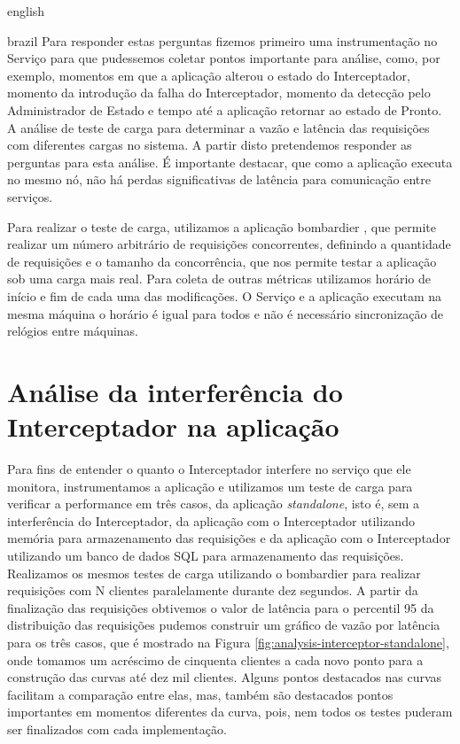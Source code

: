\begin{otherlanguage*}{english}
\begin{otherlanguage*}{brazil}
Para responder estas perguntas fizemos primeiro uma instrumentação no Serviço para que
pudessemos coletar pontos importante para análise, como, por exemplo, momentos em que a
aplicação alterou o estado do Interceptador, momento da introdução da falha do Interceptador,
momento da detecção pelo Administrador de Estado e tempo até a aplicação retornar ao estado
de Pronto. A análise de teste de carga para determinar a vazão e latência das requisições com
diferentes cargas no sistema. A partir disto pretendemos responder as perguntas para esta
análise. É importante destacar, que como a aplicação executa no mesmo nó, não há perdas
significativas de latência para comunicação entre serviços.

Para realizar o teste de carga, utilizamos a aplicação bombardier \cite{bombardier}, que
permite realizar um número arbitrário de requisições concorrentes, definindo a quantidade
de requisições e o tamanho da concorrência, que nos permite testar a aplicação sob uma
carga mais real. Para coleta de outras métricas utilizamos horário de início e fim de cada
uma das modificações. O Serviço e a aplicação executam na mesma máquina o horário é
igual para todos e não é necessário sincronização de relógios entre máquinas.

\section{Análise da interferência do Interceptador na aplicação}

Para fins de entender o quanto o Interceptador interfere no serviço que ele monitora,
instrumentamos a aplicação e utilizamos um teste de carga para verificar a performance
em três casos, da aplicação \textit{standalone}, isto é, sem a interferência do Interceptador,
da aplicação com o Interceptador utilizando memória para armazenamento das requisições e 
da aplicação com o Interceptador utilizando um banco de dados SQL para armazenamento das
requisições. Realizamos os mesmos testes de carga utilizando o bombardier para realizar
requisições com N clientes paralelamente durante dez segundos. A partir da finalização
das requisições obtivemos o valor de latência para o percentil 95 da distribuição das requisições 
pudemos construir um gráfico de vazão por latência para os três casos, que é mostrado na Figura
\ref{fig:analysis-interceptor-standalone}, onde tomamos um acréscimo de cinquenta clientes a cada
novo ponto para a construção das curvas até dez mil clientes. Alguns pontos destacados nas curvas
facilitam a comparação entre elas, mas, também são destacados pontos importantes em momentos
diferentes da curva, pois, nem todos os testes puderam ser finalizados com cada implementação.


\end{otherlanguage*}
\end{otherlanguage*}
